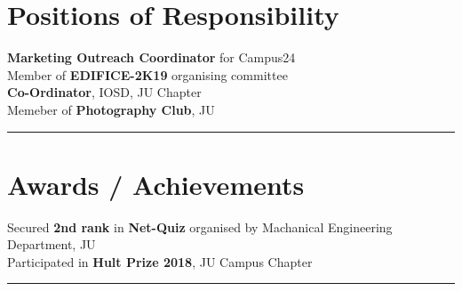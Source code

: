 \documentclass[]{Ankit-resume}
\begin{document}
\sectionsep
\vspace{\baselineskip}



\section{Positions of Responsibility} 
\postsectionsep
\vspace{\baselineskip}
\textbullet{} \textbf{Marketing Outreach Coordinator} for Campus24\\
\vspace{1}
\textbullet{} Member of \textbf{EDIFICE-2K19} organising committee\\
\vspace{1}
\textbullet{} \textbf{Co-Ordinator}, IOSD, JU Chapter\\
\vspace{1}
\textbullet{} Memeber of \textbf{Photography Club}, JU
\sectionsep
{\color{black}\hrule}
\vspace{\baselineskip}
\section{Awards / Achievements} 
\postsectionsep
\vspace{\baselineskip}

\textbullet{} Secured \textbf{2nd rank} in \textbf{Net-Quiz} organised by Machanical Engineering Department, JU\\
\vspace{1}
\textbullet{} Participated in \textbf{Hult Prize 2018}, JU Campus Chapter\\
\vspace{\baselineskip}
{\color{black}\hrule}
\sectionsep

\end{document}
